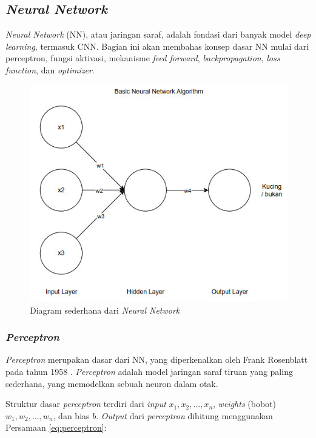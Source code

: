 \subsection{\emph{Neural Network}}
\emph{Neural Network} (NN), atau jaringan saraf, adalah fondasi dari banyak model \emph{deep learning}, termasuk CNN. Bagian ini akan membahas konsep dasar NN mulai dari perceptron, fungsi aktivasi, mekanisme \emph{feed forward}, \emph{backpropagation}, \emph{loss function}, dan \emph{optimizer}.

\begin{figure}[H]
  \centering
  \includegraphics[scale=0.6]{gambar/bab2-basic-nn.jpeg}
  \caption{Diagram sederhana dari \emph{Neural Network}}
  \label{fig:basic_nn}
\end{figure}

\subsubsection{\emph{Perceptron}}
\emph{Perceptron} merupakan dasar dari NN, yang diperkenalkan oleh Frank Rosenblatt pada tahun 1958 \parencite*{rosenblatt1958perceptron}. \emph{Perceptron} adalah model jaringan saraf tiruan yang paling sederhana, yang memodelkan sebuah neuron dalam otak.

Struktur dasar \emph{perceptron} terdiri dari \emph{input} \( x_1, x_2, \dots, x_n \), \emph{weights} (bobot) \( w_1, w_2, \dots, w_n \), dan bias \( b \). \emph{Output} dari \emph{perceptron} dihitung menggunakan Persamaan \ref{eq:perceptron}:

